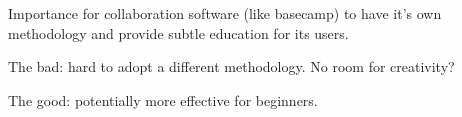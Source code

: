 Importance for collaboration software (like basecamp) to have it's own methodology and provide subtle education for its users.

The bad: hard to adopt a different methodology. No room for creativity?

The good: potentially more effective for beginners.






%
%
%
%
%
%
%
%
%
%
%
%


